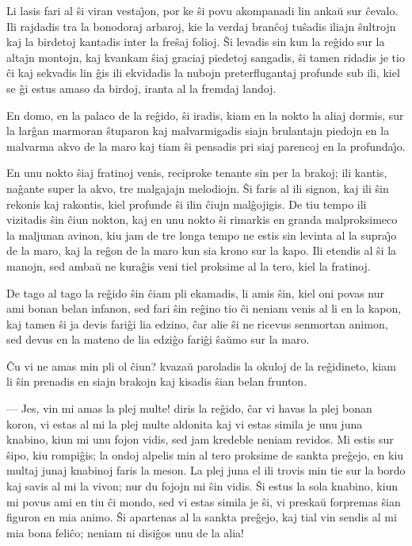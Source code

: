   Li lasis fari al \^si viran vesta\^{\j}on, por ke \^si povu akompanadi
lin anka\u u sur \^cevalo. Ili rajdadis tra la bonodoraj arbaroj,
kie la verdaj bran\^coj tu\^sadis iliajn \^sultrojn kaj la birdetoj
kantadis inter la fre\^saj folioj. \^Si levadis sin kun la re\^gido
sur la altajn montojn, kaj kvankam \^siaj graciaj piedetoj sangadis,
\^si tamen ridadis je tio \^ci kaj sekvadis lin \^gis ili ekvidadis
la nubojn preterflugantaj profunde sub ili, kiel se \^gi estus amaso
da birdoj, iranta al la fremdaj landoj.

   En domo, en la palaco de la re\^gido, \^si iradis, kiam en la nokto la
aliaj dormis, sur la lar\^gan marmoran \^stuparon kaj malvarmigadis
siajn brulantajn piedojn en la malvarma akvo de la maro kaj tiam
\^si pensadis pri siaj parencoj en la profunda\^{\j}o.

   En unu nokto \^siaj fratinoj venis, reciproke tenante sin per la
brakoj; ili kantis, na\^gante super la akvo, tre malgajajn
melodiojn. \^Si faris al ili signon, kaj ili \^sin rekonis kaj
rakontis, kiel profunde \^si ilin \^ciujn mal\^gojigis. De tiu tempo
ili vizitadis \^sin \^ciun nokton, kaj en unu nokto \^si rimarkis en
granda malproksimeco la maljunan avinon, kiu jam de tre longa tempo
ne estis sin levinta al la supra\^{\j}o de la maro, kaj la re\^gon
de la maro kun sia krono sur la kapo. Ili etendis al \^si la manojn,
sed amba\u u ne kura\^gis veni tiel proksime al la tero, kiel la
fratinoj.

   De tago al tago la re\^gido \^sin \^ciam pli ekamadis, li amis \^sin,
kiel oni povas nur ami bonan belan infanon, sed fari \^sin re\^gino
tio \^ci neniam venis al li en la kapon, kaj tamen \^si ja devis
fari\^gi lia edzino, \^car alie \^si ne ricevus senmortan animon,
sed devus en la mateno de lia edzi\^go fari\^gi \^sa\u umo sur la
maro.

   \^Cu vi ne amas min pli ol \^ciun? kvaza\u u paroladis la okuloj de la
re\^gidineto, kiam li \^sin prenadis en siajn brakojn kaj kisadis
\^sian belan frunton.

 --- Jes, vin mi amas la plej multe! diris la re\^gido, \^car vi havas
la plej bonan koron, vi estas al mi la plej multe aldonita kaj vi
estas simila je unu juna knabino, kiun mi unu fojon vidis, sed jam
kredeble neniam revidos. Mi estis sur \^sipo, kiu rompi\^gis; la
ondoj alpelis min al tero proksime de sankta pre\^gejo, en kiu
multaj junaj knabinoj faris la meson. La plej juna el ili trovis min
tie sur la bordo kaj savis al mi la vivon; nur du fojojn mi \^sin
vidis. \^Si estus la sola knabino, kiun mi povus ami en tiu \^ci
mondo, sed vi estas simila je \^si, vi preska\u u forpremas \^sian
figuron en mia animo. \^Si apartenas al la sankta pre\^gejo, kaj
tial vin sendis al mi mia bona feli\^co; neniam ni disi\^gos unu de
la alia!


